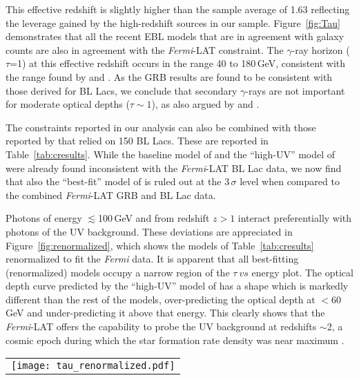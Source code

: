 \documentclass[12pt,preprint]{aastex}
\begin{document}
This effective redshift is slightly higher than the sample average of 1.63 reflecting
the leverage gained by {the high-redshift sources in our sample}.
Figure~\ref{fig:Tau} demonstrates that all the recent EBL models that are in 
agreement with
galaxy counts are also in agreement with the {\it Fermi}-LAT constraint.
The $\gamma$-ray horizon ($\tau$=1) at this effective redshift {occurs} in the range
40 to 180\,GeV, consistent with the range found by \cite{dominguez11} and \cite{2fhl}.
 {As the GRB results are found to be
consistent with those derived for BL Lacs, we conclude that secondary $\gamma$-rays
are not important for moderate optical depths ($\tau\sim1$), as also argued by \cite{biteau2015} and \cite{dominguez2015}.}

The constraints reported in our analysis can also be combined with those reported
by \cite{ebl12} that relied on 150 BL Lacs. These are reported in
Table~\ref{tab:cresults}. While the baseline model of
\cite{stecker06} and the ``high-UV'' model of \cite{kneiske04} were
already found inconsistent with the {\it Fermi}-LAT BL Lac data, we now find
that also the ``best-fit'' model of \cite{kneiske04} is ruled out at {the}
$3\,\sigma$ level when compared to the combined {\it Fermi}-LAT GRB and BL Lac data.  

Photons of energy $\lesssim$100\,GeV and from redshift $z>1$ interact
preferentially with
photons of the UV background.
These deviations are appreciated in Figure~\ref{fig:renormalized}, which shows
the models of Table~\ref{tab:cresults} renormalized to fit the {\it Fermi} 
data. It is apparent that all best-fitting (renormalized)
models occupy a narrow region of the $\tau\ vs $ energy plot.
The optical depth curve predicted by the ``high-UV'' model of \cite{kneiske04}
has a shape which is
markedly different than the rest of the models, over-predicting the
optical depth at $<$60\,GeV and under-predicting it above that energy.
This clearly shows that the {\it Fermi}-LAT offers the 
capability to probe the UV background at redshifts $\sim$2, a cosmic epoch
during which the star formation rate density was near maximum
\citep[][]{madau96,bouwens15}.





\begin{figure*}[ht!]

  \begin{center}

  \begin{tabular}{c}
    \texttt{[image: tau\_renormalized.pdf]}
\end{tabular}

  \end{center}
  \caption{EBL models renormalized to fit the {\it Fermi}-LAT data. The high-UV model of \cite{kneiske04} can be rejected (at 3\,$\sigma$ level) on the basis of the shape of its predicted optical depth curve.}
\label{fig:renormalized}

\end{figure*}
\end{document}

